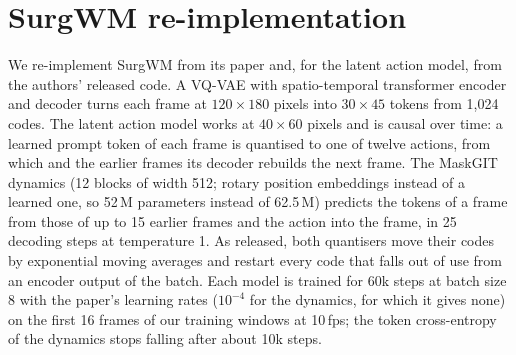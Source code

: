 \documentclass[journal]{IEEEtran}
\begin{document}
\begin{table}[h]
\centering
\caption{Pilots: frame-wide learned actions and the endoscope action (step 12k, the same 256 validation windows). Swap: rise of the replay error with another window's action; for the endoscope with the learned actions zeroed.}
\label{tab:pilot-scene}
\end{table}

\section{SurgWM re-implementation}\label{sec:surgwm}
We re-implement SurgWM from its paper and, for the latent action model, from the authors' released code. A VQ-VAE with spatio-temporal transformer encoder and decoder turns each frame at $120\times180$ pixels into $30\times45$ tokens from 1,024 codes. The latent action model works at $40\times60$ pixels and is causal over time: a learned prompt token of each frame is quantised to one of twelve actions, from which and the earlier frames its decoder rebuilds the next frame. The MaskGIT dynamics (12 blocks of width 512; rotary position embeddings instead of a learned one, so 52\,M parameters instead of 62.5\,M) predicts the tokens of a frame from those of up to 15 earlier frames and the action into the frame, in 25 decoding steps at temperature 1. As released, both quantisers move their codes by exponential moving averages and restart every code that falls out of use from an encoder output of the batch. Each model is trained for 60k steps at batch size 8 with the paper's learning rates ($10^{-4}$ for the dynamics, for which it gives none) on the first 16 frames of our training windows at 10\,fps; the token cross-entropy of the dynamics stops falling after about 10k steps.
\end{document}
